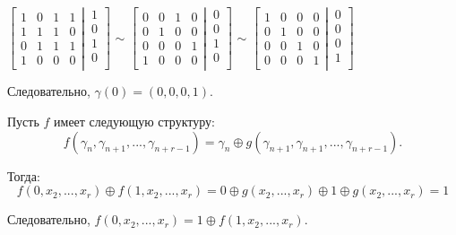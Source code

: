 \documentclass[letterpaper,11pt,openany]{book}
\begin{document}
$
\left[
  \begin{matrix}
1 &0 &1 &1\\
1 &1 &1 &0 \\
0 &1 &1 &1 \\
1 &0 &0 &0
  \end{matrix}
  \left|
    \,
    \begin{matrix}
      1  \\
      0  \\
      1  \\
      0  \\
    \end{matrix}
  \right.
\right]
$
$\sim$
$
\left[
  \begin{matrix}
0 &0 &1 &0\\
0 &1 &0 &0 \\
0 &0 &0 &1 \\
1 &0 &0 &0
  \end{matrix}
  \left|
    \,
    \begin{matrix}
      0  \\
      0  \\
      1  \\
      0  \\
    \end{matrix}
  \right.
\right]
$
$\sim$
$
\left[
  \begin{matrix}
	1 &0 &0 &0 \\
	0 &1 &0 &0 \\
	0 &0 &1 &0 \\
	0 &0 &0 &1
  \end{matrix}
  \left|
    \,
    \begin{matrix}
      0  \\
      0  \\
      0  \\
      1  \\
    \end{matrix}
  \right.
\right]
$

Следовательно, $\gamma(0) = (0, 0, 0, 1)$.


Пусть $f$ имеет следующую структуру: $$f(\gamma_n, \gamma_{n+1}, ..., \gamma_{n + r - 1}) = \gamma_n \oplus g(\gamma_{n+1}, \gamma_{n+1}, ..., \gamma_{n + r - 1}).$$

\noindent Тогда: $$f(0, x_2, ...,x_r) \oplus f(1, x_2, ...,x_r) = 0 \oplus g(x_2, ...,x_r) \oplus 1 \oplus g(x_2, ...,x_r) = 1$$

\noindent Следовательно, $f(0, x_2, ...,x_r) = 1 \oplus f(1, x_2, ...,x_r).$
\end{document}
